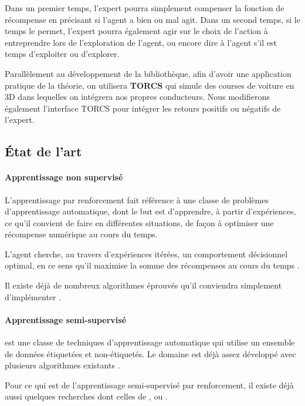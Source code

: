 \documentclass[a4paper,12pt]{article}
\begin{document}
	Dans un premier temps, l'expert pourra simplement compenser la fonction de récompense en précisant si 
	l'agent a bien ou mal agit. Dans un second temps, si le temps le permet, l'expert pourra également agir 
	sur le choix de l'action à entreprendre lors de l'exploration de l'agent, ou encore dire à l'agent s'il 
	est temps d'exploiter ou d'explorer.
	
	Parallèlement au développement de la bibliothèque, afin d'avoir une application pratique 
	de la théorie,
	on utilisera \textbf{TORCS} qui simule des courses de voiture en 3D dans lequelles on 
	intégrera nos propres conducteurs.
	Nous modifierons 
	également l'interface TORCS pour intégrer les retours positifs ou négatifs de l'expert.

  \subsection{État de l'art}
    \paragraph{Apprentissage non supervisé} 
      L'apprentissage par renforcement fait référence à une classe de problèmes d'apprentissage automatique, 
      dont le but est d'apprendre, à partir d'expériences, ce qu'il convient de faire en différentes situations, 
      de façon à optimiser une récompense numérique au cours du temps.

      L'agent cherche, au travers d'expériences itérées, un comportement décisionnel optimal, en ce sens qu'il 
      maximise la somme des récompenses au cours du temps
      \cite{Wiki_Reinforcement_learning}.
      
      Il existe déjà de nombreux algorithmes éprouvés qu'il conviendra simplement d'implémenter
      \cite{ReinforceLearningIntro}.
  
    \vfill
    \paragraph{Apprentissage semi-supervisé} 
      est une classe de techniques d'apprentissage automatique qui utilise
      un ensemble de données étiquetées et non-étiquetés.
      Le domaine est déjà assez développé avec plusieurs algorithmes existants
      \cite{Wiki_SemiSupervised}.
      
      Pour ce qui est de l'apprentissage semi-supervisé par renforcement, 
      il existe déjà aussi quelques recherches dont celles de
      \cite{semi1},\cite{semi2} ou \cite{semi3}.
  
\end{document}
